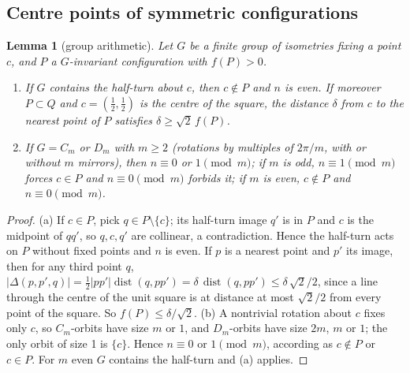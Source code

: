 \documentclass[11pt]{amsart}
\newtheorem{lemma}[theorem]{Lemma}
\theoremstyle{definition}
\begin{document}
\subsection{Centre points of symmetric configurations}

\begin{lemma}[group arithmetic]\label{lem:group}
Let $G$ be a finite group of isometries fixing a point $c$, and $P$ a $G$-invariant configuration with $f(P) > 0$.
\begin{enumerate}[label=(\alph*)]
\item If $G$ contains the half-turn about $c$, then $c \notin P$ and $n$ is even. If moreover $P \subset Q$ and $c = (\tfrac12,\tfrac12)$ is the centre of the square, the distance $\delta$ from $c$ to the nearest point of $P$ satisfies $\delta \ge \sqrt2\, f(P)$.
\item If $G = C_m$ or $D_m$ with $m \ge 2$ (rotations by multiples of $2\pi/m$, with or without $m$ mirrors), then $n \equiv 0$ or $1 \pmod m$; if $m$ is odd, $n \equiv 1 \pmod m$ forces $c \in P$ and $n \equiv 0 \pmod m$ forbids it; if $m$ is even, $c \notin P$ and $n \equiv 0 \pmod m$.
\end{enumerate}
\end{lemma}

\begin{proof}
(a) If $c \in P$, pick $q \in P\setminus\{c\}$; its half-turn image $q'$ is in $P$ and $c$ is the midpoint of $qq'$, so $q, c, q'$ are collinear, a contradiction. Hence the half-turn acts on $P$ without fixed points and $n$ is even. If $p$ is a nearest point and $p'$ its image, then for any third point $q$, $\lvert\Delta(p,p',q)\rvert = \tfrac12\lvert pp'\rvert\operatorname{dist}(q, pp') = \delta\, \operatorname{dist}(q, pp') \le \delta\, \sqrt2/2$, since a line through the centre of the unit square is at distance at most $\sqrt2/2$ from every point of the square. So $f(P) \le \delta/\sqrt2$.
(b) A nontrivial rotation about $c$ fixes only $c$, so $C_m$-orbits have size $m$ or $1$, and $D_m$-orbits have size $2m$, $m$ or $1$; the only orbit of size 1 is $\{c\}$. Hence $n \equiv 0$ or $1 \pmod m$, according as $c \notin P$ or $c \in P$. For $m$ even $G$ contains the half-turn and (a) applies.
\end{proof}
\end{document}
